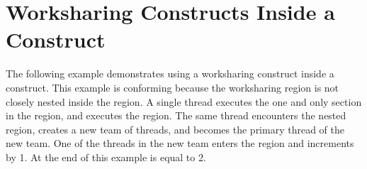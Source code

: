 \section{Worksharing Constructs Inside a  Construct}
\label{sec:worksharing_critical}

The following example demonstrates using a worksharing construct inside a  
construct. This example is conforming because the worksharing   
region is not closely nested inside the  region. A single thread 
executes the one and only section in the  region, and executes 
the  region. The same thread encounters the nested  
region, creates a new team of threads, and becomes the primary thread of the new team. 
One of the threads in the new team enters the  region and increments 
 by 1. At the end of this example  is equal to 2.




